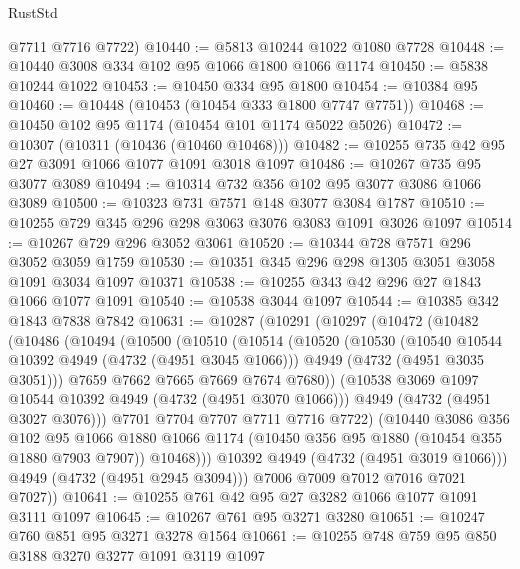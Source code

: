 \begin{lexlean}{RustStd}
\begin{coremodule}
      @7711
      @7716
      @7722)
@10440 := @5813 @10244 @1022 @1080 @7728
@10448 := @10440 @3008 @334 @102 @95 @1066 @1800 @1066 @1174
@10450 := @5838 @10244 @1022
@10453 := @10450 @334 @95 @1800
@10454 := @10384 @95
@10460 := @10448 (@10453 (@10454 @333 @1800 @7747 @7751))
@10468 := @10450 @102 @95 @1174 (@10454 @101 @1174 @5022 @5026)
@10472 := @10307 (@10311 (@10436 (@10460 @10468)))
@10482 := @10255 @735 @42 @95 @27 @3091 @1066 @1077 @1091 @3018 @1097
@10486 := @10267 @735 @95 @3077 @3089
@10494 := @10314 @732 @356 @102 @95 @3077 @3086 @1066 @3089
@10500 := @10323 @731 @7571 @148 @3077 @3084 @1787
@10510 := @10255 @729 @345 @296 @298 @3063 @3076 @3083 @1091 @3026 @1097
@10514 := @10267 @729 @296 @3052 @3061
@10520 := @10344 @728 @7571 @296 @3052 @3059 @1759
@10530 := @10351 @345 @296 @298 @1305 @3051 @3058 @1091 @3034 @1097 @10371
@10538 := @10255 @343 @42 @296 @27 @1843 @1066 @1077 @1091
@10540 := @10538 @3044 @1097
@10544 := @10385 @342 @1843 @7838 @7842
@10631 := @10287
    (@10291
      (@10297
        (@10472
          (@10482
            (@10486
              (@10494
                (@10500
                  (@10510
                    (@10514
                      (@10520
                        (@10530
                          (@10540 @10544 @10392 @4949 (@4732 (@4951 @3045 @1066)))
                          @4949
                          (@4732 (@4951 @3035 @3051)))
                        @7659
                        @7662
                        @7665
                        @7669
                        @7674
                        @7680))
                    (@10538 @3069 @1097 @10544 @10392 @4949 (@4732 (@4951 @3070 @1066)))
                    @4949
                    (@4732 (@4951 @3027 @3076)))
                  @7701
                  @7704
                  @7707
                  @7711
                  @7716
                  @7722)
                (@10440
                  @3086
                  @356
                  @102
                  @95
                  @1066
                  @1880
                  @1066
                  @1174
                  (@10450 @356 @95 @1880 (@10454 @355 @1880 @7903 @7907))
                  @10468)))
            @10392
            @4949
            (@4732 (@4951 @3019 @1066)))
          @4949
          (@4732 (@4951 @2945 @3094)))
        @7006
        @7009
        @7012
        @7016
        @7021
        @7027))
@10641 := @10255 @761 @42 @95 @27 @3282 @1066 @1077 @1091 @3111 @1097
@10645 := @10267 @761 @95 @3271 @3280
@10651 := @10247 @760 @851 @95 @3271 @3278 @1564
@10661 := @10255 @748 @759 @95 @850 @3188 @3270 @3277 @1091 @3119 @1097

\end{coremodule}
\end{lexlean}
